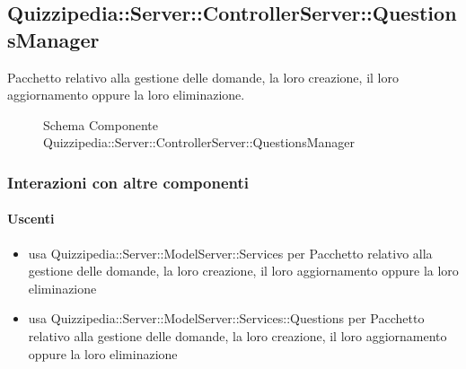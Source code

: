 \subsection{Quizzipedia::Server::ControllerServer::QuestionsManager}
Pacchetto relativo alla gestione delle domande, la loro creazione, il loro aggiornamento oppure la loro eliminazione.
\begin{figure}[H]
\centering
\noindent{}
\caption[Schema Componente Quizzipedia::Server::ControllerServer::QuestionsManager]{Schema Componente Quizzipedia::Server::ControllerServer::QuestionsManager}
\end{figure}
\subsubsection{Interazioni con altre componenti}
\paragraph{Uscenti}
\begin{itemize}
\item usa Quizzipedia::Server::ModelServer::Services per Pacchetto relativo alla gestione delle domande, la loro creazione, il loro aggiornamento oppure la loro eliminazione
\item usa Quizzipedia::Server::ModelServer::Services::Questions per Pacchetto relativo alla gestione delle domande, la loro creazione, il loro aggiornamento oppure la loro eliminazione
\end{itemize}
